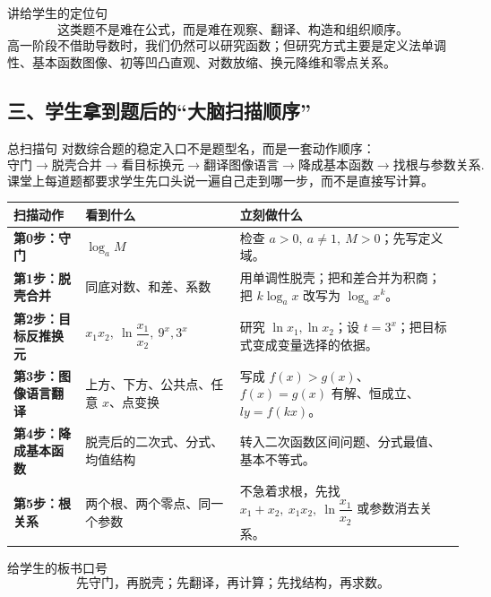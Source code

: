 \documentclass[11pt,a4paper]{ctexart}
\begin{document}
\begin{keybox}{讲给学生的定位句}
\[
\boxed{\text{这类题不是难在公式，而是难在观察、翻译、构造和组织顺序。}}
\]
高一阶段不借助导数时，我们仍然可以研究函数；但研究方式主要是定义法单调性、基本函数图像、初等凹凸直观、对数放缩、换元降维和零点关系。
\end{keybox}

\subsection*{三、学生拿到题后的“大脑扫描顺序”}

\begin{teachbox}{总扫描句}
对数综合题的稳定入口不是题型名，而是一套动作顺序：
\[
\boxed{
\text{守门}
\to
\text{脱壳合并}
\to
\text{看目标换元}
\to
\text{翻译图像语言}
\to
\text{降成基本函数}
\to
\text{找根与参数关系}.}
\]
课堂上每道题都要求学生先口头说一遍自己走到哪一步，而不是直接写计算。
\end{teachbox}

\begin{center}
\renewcommand{\arraystretch}{1.3}
\begin{tabularx}{0.95\linewidth}{>{\bfseries}p{2.3cm} X X}
\toprule
扫描动作 & 看到什么 & 立刻做什么 \\
\midrule
第0步：守门 & $\log_a M$ & 检查 $a>0,\ a\ne1,\ M>0$；先写定义域。 \\
第1步：脱壳合并 & 同底对数、和差、系数 & 用单调性脱壳；把和差合并为积商；把 $k\log_a x$ 改写为 $\log_a x^k$。 \\
第2步：目标反推换元 & $x_1x_2,\ \ln\dfrac{x_1}{x_2},\ 9^x,3^x$ & 研究 $\ln x_1,\ln x_2$；设 $t=3^x$；把目标式变成变量选择的依据。 \\
第3步：图像语言翻译 & 上方、下方、公共点、任意 $x$、点变换 & 写成 $f(x)>g(x)$、$f(x)=g(x)$ 有解、恒成立、$ly=f(kx)$。 \\
第4步：降成基本函数 & 脱壳后的二次式、分式、均值结构 & 转入二次函数区间问题、分式最值、基本不等式。 \\
第5步：根关系 & 两个根、两个零点、同一个参数 & 不急着求根，先找 $x_1+x_2,\ x_1x_2,\ \ln\dfrac{x_1}{x_2}$ 或参数消去关系。 \\
\bottomrule
\end{tabularx}
\end{center}

\begin{keybox}{给学生的板书口号}
\[
\boxed{\text{先守门，再脱壳；先翻译，再计算；先找结构，再求数。}}
\]
\end{keybox}
\end{document}
